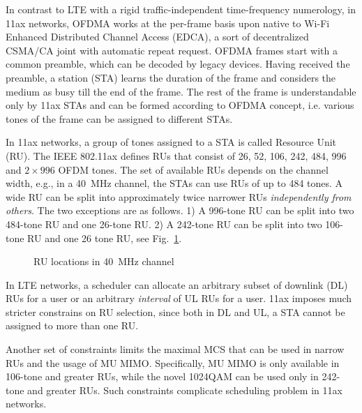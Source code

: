 
In contrast to LTE with a rigid traffic-independent time-frequency numerology, in 11ax networks, OFDMA works at the per-frame basis upon native to Wi-Fi Enhanced Distributed Channel Access (EDCA), a sort of decentralized CSMA/CA joint with automatic repeat request.
OFDMA frames start with a common preamble, which can be decoded by legacy devices.
Having received the preamble, a station (STA) learns the duration of the frame and considers the medium as busy till the end of the frame.
The rest of the frame is understandable only by 11ax STAs and can be formed according to OFDMA concept, i.e. various tones of the frame can be assigned to different STAs. 

In 11ax networks, a group of tones assigned to a STA is called Resource Unit (RU).
The IEEE 802.11ax defines RUs that consist of 26, 52, 106, 242, 484, 996 and $2\times996$ OFDM tones.
The set of available RUs depends on the channel width, e.g., in a \SI{40}{\MHz} channel, the STAs can use RUs of up to 484 tones.
A wide RU can be split into approximately twice narrower RUs \textit{independently from others}. The two exceptions are as follows.
1) A 996-tone RU can be split into two 484-tone RU and one 26-tone RU.
2) A 242-tone RU can be split into two 106-tone RU and one 26 tone RU, see Fig.~\ref{fig:resource_units}.

\begin{figure}[tb]
	\centering
	
	\caption{\label{fig:resource_units} RU locations in \SI{40}{\MHz} channel}
\vspace{-0.5em}
\end{figure}

In LTE networks, a scheduler can allocate an arbitrary subset of downlink (DL) RUs for a user or an arbitrary \emph{interval} of UL RUs for a user.
11ax imposes much stricter constrains on RU selection, since both in DL and UL, a STA cannot be assigned to more than one RU.

Another set of constraints limits the maximal MCS that can be used in narrow RUs and the usage of MU MIMO.
Specifically, MU MIMO is only available in 106-tone and greater RUs, while the novel 1024QAM can be used only in 242-tone and greater RUs.
Such constraints complicate scheduling problem in 11ax networks.


